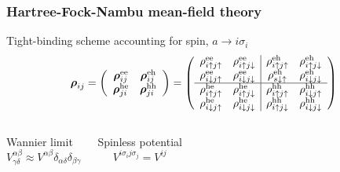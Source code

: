 \documentclass{beamer}
\begin{document}
\begin{frame}
\frametitle{Hartree-Fock-Nambu mean-field theory}

\begin{exampleblock}{Tight-binding scheme accounting for spin, $a\rightarrow i\sigma_{i}$}
\begin{equation*}
\boldsymbol{\rho}_{ij}=\left(\begin{array}{cc}
\boldsymbol{\rho}_{ij}^{\text{\text{ee}}} & \boldsymbol{\rho}_{ij}^{\text{eh}}\\
\boldsymbol{\rho}_{ji}^{\text{he}} & \boldsymbol{\rho}_{ji}^{\text{\text{hh}}}
\end{array}\right)=\left(\begin{array}{cc|cc}
\rho_{i\uparrow j\uparrow}^{\text{ee}} & \rho_{i\uparrow j\downarrow}^{\text{ee}} & \rho_{i\uparrow j\uparrow}^{\text{eh}} & \rho_{i\uparrow j\downarrow}^{\text{eh}}\\
\rho_{i\downarrow j\uparrow}^{\text{ee}} & \rho_{i\downarrow j\downarrow}^{\text{ee}} & \rho_{s\downarrow\uparrow}^{\text{eh}} & \rho_{i\downarrow j\downarrow}^{\text{eh}}\\
\hline \rho_{i\uparrow j\uparrow}^{\text{he}} & \rho_{i\uparrow j\downarrow}^{\text{he}} & \rho_{i\uparrow j\uparrow}^{\text{hh}} & \rho_{i\downarrow j\uparrow}^{\text{hh}}\\
\rho_{i\downarrow j\uparrow}^{\text{he}} & \rho_{i\downarrow j\downarrow}^{\text{he}} & \rho_{i\uparrow j\downarrow}^{\text{hh}} & \rho_{i\downarrow j\downarrow}^{\text{hh}}
\end{array}\right)
\end{equation*}
\end{exampleblock}
\pause

\begin{columns}
\column{3cm}
\begin{alertblock}{Wannier limit}
\vspace*{-4mm}
\begin{equation*}
V_{\gamma\delta}^{\alpha\beta}\approx V^{\alpha\beta}\delta_{\alpha\delta}\delta_{\beta\gamma}
\end{equation*}
\end{alertblock}
\begin{alertblock}{Spinless potential}
\vspace*{-4mm}
\begin{equation*}
V^{i\sigma_{i}j\sigma_{j}}=V^{ij}
\end{equation*}
\end{alertblock}
\pause


\end{columns}
\end{frame}
\end{document}
